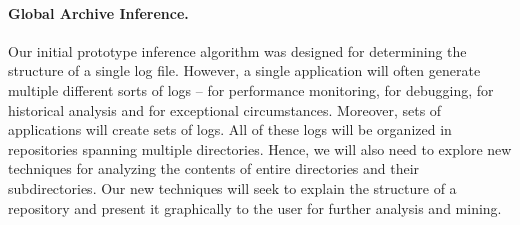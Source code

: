 \paragraph*{Global Archive Inference.}  Our initial prototype inference algorithm
was designed for determining the structure of a single log file.
However, a single application will often generate multiple different
sorts of logs -- for performance monitoring, for debugging, for 
historical analysis and for exceptional circumstances.  Moreover,
sets of applications will create sets of logs.  All of these logs
will be organized in repositories spanning multiple directories.
Hence, we will also need to explore new techniques for analyzing the contents
of entire directories and their subdirectories.  Our new techniques
will seek to explain the structure of a repository and present it graphically
to the user for further analysis and mining.